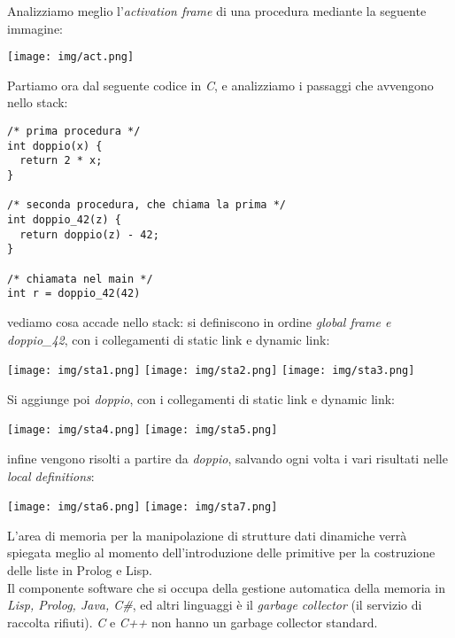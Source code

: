 \documentclass[a4paper,12pt, oneside]{book}
\begin{document}
Analizziamo meglio l'\textit{activation frame} di una procedura mediante la seguente immagine:
\begin{center}
\texttt{[image: img/act.png]}
\end{center}
\newpage
Partiamo ora dal seguente codice in \textit{C}, e analizziamo i passaggi che avvengono nello stack:
\begin{verbatim}
/* prima procedura */
int doppio(x) { 
  return 2 * x; 
}

/* seconda procedura, che chiama la prima */
int doppio_42(z) { 
  return doppio(z) - 42; 
}

/* chiamata nel main */
int r = doppio_42(42)
\end{verbatim} 
vediamo cosa accade nello stack:
si definiscono in ordine \textit{global frame e doppio\_42}, con i collegamenti di static link e dynamic link:
\begin{center}
\texttt{[image: img/sta1.png]}
\quad 
\texttt{[image: img/sta2.png]}
\quad
\texttt{[image: img/sta3.png]}
\end{center}
\newpage
Si aggiunge poi \textit{doppio}, con i collegamenti di static link e dynamic link:
\begin{center}
\texttt{[image: img/sta4.png]}
\quad 
\texttt{[image: img/sta5.png]}
\end{center}
infine vengono risolti a partire da \textit{doppio}, salvando ogni volta i vari risultati nelle \textit{local definitions}:
\begin{center}
\texttt{[image: img/sta6.png]}
\quad
\texttt{[image: img/sta7.png]}
\end{center}
L'area di memoria per la manipolazione di strutture dati dinamiche verrà spiegata meglio al momento dell'introduzione delle primitive per la costruzione delle liste in Prolog e Lisp.\\
Il componente software che si occupa della gestione automatica della memoria in \textit{Lisp, Prolog, Java, C\#}, ed altri linguaggi è il \textit{garbage collector} (il servizio di raccolta rifiuti). \textit{C} e \textit{C++} non hanno un garbage collector standard.
\end{document}
